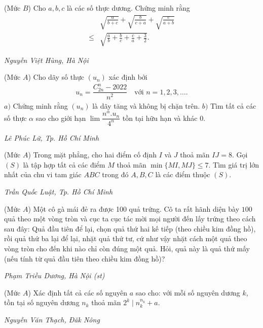 \begin{multicols}{2}
	(Mức $B$) Cho $a, b, c$ là các số thực dương. Chứng minh rằng
	\begin{align*}
		&\sqrt{\frac{a}{b+c}}+\sqrt{\frac{b}{c+a}}+\sqrt{\frac{c}{a+b}}\\
		\leq &\sqrt{\frac{a}{b}+\frac{b}{c}+\frac{c}{a}+\frac{3}{2}} .
	\end{align*}
	\begin{flushright}
		\textit{Nguyễn Việt Hùng, Hà Nội}
	\end{flushright}
	{}
	(Mức $A$) Cho dãy số thực $(u_n)$ xác định bởi 
	\begin{align*}
		u_n=\dfrac{C^n_{2n}-2022}{n^2}\quad\text{với $n=1,2,3,\ldots$}.
	\end{align*}
	$a)$ Chứng minh rằng $(u_n)$ là dãy tăng và không bị chặn trên.
	\vskip 0.05cm
	$b)$ Tìm tất cả các số thực $\alpha$ sao cho giới hạn $\lim \dfrac{n^\alpha. u_n}{4^n}$ tồn tại hữu hạn và khác $0$. 
	\begin{flushright}
		\textit{Lê Phúc Lữ, Tp. Hồ Chí Minh}
	\end{flushright}
	{}
	(Mức $A$) Trong mặt phẳng, cho hai điểm cố định $I$ và $J$ thoả mãn $IJ=8$. Gọi $(S)$ là tập hợp tất cả các điểm $M$ thoả mãn $\min\{MI,MJ\}\leq 7$. Tìm giá trị lớn nhất của chu vi tam giác $ABC$ trong đó $A,B,C$ là các điểm thuộc $(S)$. 
	\begin{flushright}
		\textit{Trần Quốc Luật, Tp. Hồ Chí Minh}
	\end{flushright}
	{}
	(Mức $A$) Một cô gà mái đẻ ra được 100 quả trứng. Cô ta rất hãnh diện bày $100$ quả theo một vòng tròn và cục ta cục tác mời mọi người đến lấy trứng theo cách sau đây: Quả đầu tiên để lại, chọn quả thứ hai kế tiếp (theo chiều kim đồng hồ), rồi quả thứ ba lại để lại, nhặt quả thứ tư, cứ như vậy nhặt cách một quả theo vòng tròn cho đến khi nào chỉ còn đúng một quả. Hỏi, quả này là quả thứ mấy (nếu tính từ quả đầu tiên theo chiều kim đồng hồ)?
	\begin{flushright}
		\textit{Phạm Triều Dương, Hà Nội (st)}
	\end{flushright}
	{}
	(Mức $A$) Xác định tất cả các số nguyên $a$ sao cho: với mỗi số nguyên dương $k$, tồn tại số nguyên dương $n_k$ thoả mãn $2^k\mid n_k^{n_k}+a$. 
	\begin{flushright}
		\textit{Nguyễn Văn Thạch, Đăk Nông}
	\end{flushright}
\end{multicols}
